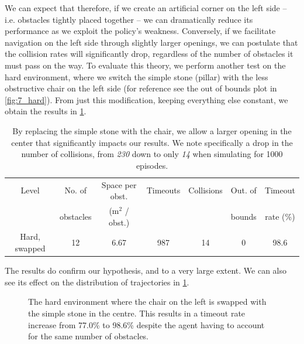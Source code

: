 We can expect that therefore, if we create an artificial corner on the left side -- i.e. obstacles tightly placed together -- we can dramatically reduce its performance as we exploit the policy's weakness. Conversely, if we facilitate navigation on the left side through slightly larger openings, we can postulate that the collision rates will significantly drop, regardless of the number of obstacles it must pass on the way.
To evaluate this theory, we perform another test on the hard environment, where we switch the simple stone (pillar) with the less obstructive chair on the left side (for reference see the out of bounds plot in \cref{fig:7_hard}). From just this modification, keeping everything else constant, we obtain the results in \cref{tab:7_hard_swapped_test}.
\begin{table}[!hbt]
    \centering
    \begin{tabular}{||c|c|c|c|c|c|c||}
    \hline
    Level & No. of & Space per obst. & Timeouts & Collisions & Out. of & Timeout \\  
     & obstacles & (m$^2$ / obst.) & & & bounds & rate (\%) \\\hline\hline
    Hard, swapped  & 12  & 6.67  & 987 & 14 & 0 & 98.6 \\\hline
    \end{tabular}
    \caption{By replacing the simple stone with the chair, we allow a larger opening in the center that significantly impacts our results. We note specifically a drop in the number of collisions, from \textit{230} down to only \textit{14} when simulating for 1000 episodes.}
    \label{tab:7_hard_swapped_test}
\end{table}
The results do confirm our hypothesis, and to a very large extent. We can also see its effect on the distribution of trajectories in \cref{fig:7_hard_swapped}.
\begin{figure}[htb]
    \centering
    \caption{The hard environment where the chair on the left is swapped with the simple stone in the centre. This results in a timeout rate increase from 77.0\% to 98.6\% despite the agent having to account for the same number of obstacles.}
    \label{fig:7_hard_swapped}
\end{figure}
